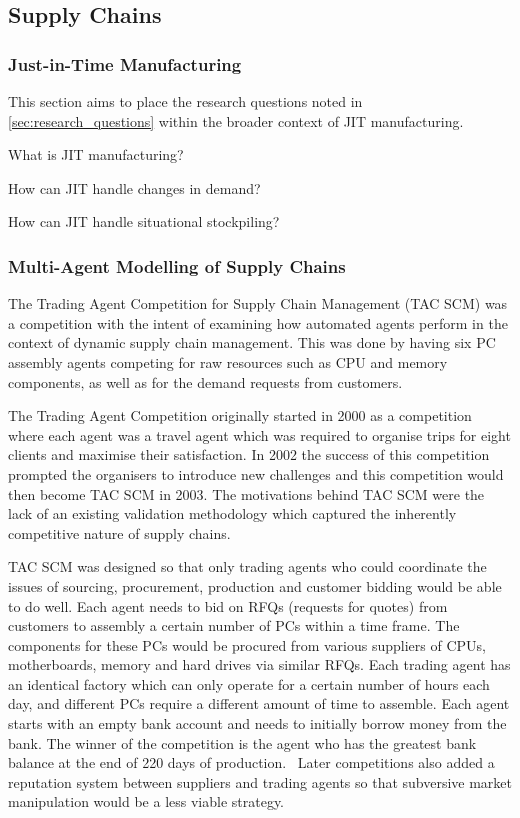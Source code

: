 \subsection{Supply Chains}

\subsubsection{Just-in-Time Manufacturing}

This section aims to place the research questions noted in \cref{sec:research_questions} within the broader context of JIT manufacturing.

What is JIT manufacturing?

How can JIT handle changes in demand?

How can JIT handle situational stockpiling?

\subsubsection{Multi-Agent Modelling of Supply Chains}

The Trading Agent Competition for Supply Chain Management (TAC SCM) was a competition with the intent of examining how automated agents perform in the context of dynamic supply chain management.
This was done by having six PC assembly agents competing for raw resources such as CPU and memory components, as well as for the demand requests from customers.~\cite{sadeh2003tac}

The Trading Agent Competition originally started in 2000 as a competition where each agent was a travel agent which was required to organise trips for eight clients and maximise their satisfaction.
In 2002 the success of this competition prompted the organisers to introduce new challenges and this competition would then become TAC SCM in 2003.
The motivations behind TAC SCM were the lack of an existing validation methodology which captured the inherently competitive nature of supply chains.~\cite{arunachalam2005supply}

TAC SCM was designed so that only trading agents who could coordinate the issues of sourcing, procurement, production and customer bidding would be able to do well.
Each agent needs to bid on RFQs (requests for quotes) from customers to assembly a certain number of PCs within a time frame.
The components for these PCs would be procured from various suppliers of CPUs, motherboards, memory and hard drives via similar RFQs.
Each trading agent has an identical factory which can only operate for a certain number of hours each day, and different PCs require a different amount of time to assemble.
Each agent starts with an empty bank account and needs to initially borrow money from the bank.
The winner of the competition is the agent who has the greatest bank balance at the end of 220 days of production.~\cite{arunachalam2005supply}
Later competitions also added a reputation system between suppliers and trading agents so that subversive market manipulation would be a less viable strategy.~\cite{collins2010pushing}

